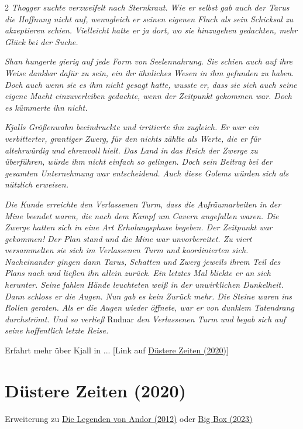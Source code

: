 \documentclass[10pt, a4paper, oneside]{book}
\newcommand{\produkt}[2][]{%
        \section{#2}%
        \label{produkt-#1}%
    }
\newcommand{\fillbreak}{\vspace*{\fill}\columnbreak}
\begin{document}
\begin{multicols}{2}
\textit{Thogger suchte verzweifelt nach Sternkraut. Wie er selbst gab auch der Tarus die Hoffnung nicht auf, wenngleich er seinen eigenen Fluch als sein Schicksal zu akzeptieren schien. Vielleicht hatte er ja dort, wo sie hinzugehen gedachten, mehr Glück bei der Suche.}\bigskip

\textit{Shan hungerte gierig auf jede Form von Seelennahrung. Sie schien auch auf ihre Weise dankbar dafür zu sein, ein ihr ähnliches Wesen in ihm gefunden zu haben. Doch auch wenn sie es ihm nicht gesagt hatte, wusste er, dass sie sich auch seine eigene Macht einzuverleiben gedachte, wenn der Zeitpunkt gekommen war. Doch es kümmerte ihn nicht.}\bigskip

\textit{Kjalls Größenwahn beeindruckte und irritierte ihn zugleich. Er war ein verbitterter, grantiger Zwerg, für den nichts zählte als Werte, die er für altehrwürdig und ehrenvoll hielt. Das Land in das Reich der Zwerge zu überführen, würde ihm nicht einfach so gelingen. Doch sein Beitrag bei der gesamten Unternehmung war entscheidend. Auch diese Golems würden sich als nützlich erweisen.}\bigskip

\textit{Die Kunde erreichte den Verlassenen Turm, dass die Aufräumarbeiten in der Mine beendet waren, die nach dem Kampf um Cavern angefallen waren. Die Zwerge hatten sich in eine Art Erholungsphase begeben. Der Zeitpunkt war gekommen! Der Plan stand und die Mine war unvorbereitet. Zu viert versammelten sie sich im Verlassenen Turm und koordinierten sich. Nacheinander gingen dann Tarus, Schatten und Zwerg jeweils ihrem Teil des Plans nach und ließen ihn allein zurück. Ein letztes Mal blickte er an sich herunter. Seine fahlen Hände leuchteten weiß in der unwirklichen Dunkelheit. Dann schloss er die Augen. Nun gab es kein Zurück mehr. Die Steine waren ins Rollen geraten. Als er die Augen wieder öffnete, war er von dunklem Tatendrang durchströmt. Und so verließ} Rudnar \textit{den Verlassenen Turm und begab sich auf seine hoffentlich letzte Reise.}\bigskip

Erfahrt mehr über Kjall in ... [Link auf \hyperref[produkt-2020-duestere-zeiten]{Düstere Zeiten (2020)}]






\fillbreak

\produkt[2020-duestere-zeiten]{Düstere Zeiten (2020)}

\begin{center}
    Erweiterung zu \hyperref[produkt-2012-die-legenden-von-andor]{Die Legenden von Andor (2012)} oder \hyperref[produkt-2023-big-box]{Big Box (2023)}
\end{center}


\end{multicols}
\end{document}
